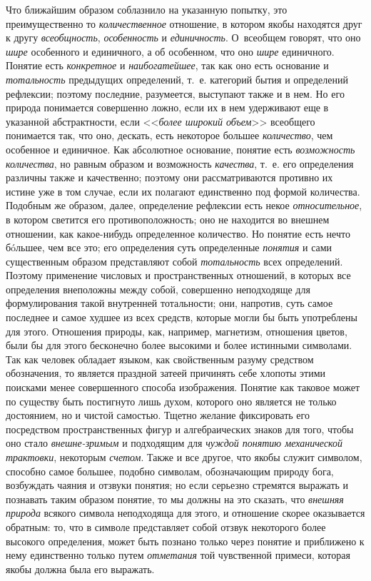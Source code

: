 Что ближайшим образом соблазнило на указанную попытку, это
преимущественно то {\em количественное}
отношение, в котором якобы находятся друг к другу
{\em всеобщность}, {\em особенность} и {\em единичность}.
О~всеобщем говорят, что оно {\em шире}
особенного и единичного, а об особенном, что оно
{\em шире} единичного. Понятие есть {\em конкретное}
и {\em наибогатейшее}, так как оно есть основание и {\em тотальность}
предыдущих определений, т.~е. категорий бытия и определений
рефлексии; поэтому последние, разумеется, выступают также и в нем. Но его
природа понимается совершенно ложно, если их в нем удерживают еще в
указанной абстрактности, если <<{\em более широкий объем}>>
всеобщего понимается так, что оно, дескать, есть некоторое
большее {\em количество},
чем особенное и единичное. Как абсолютное основание, понятие
есть {\em возможность количества},
но равным образом и возможность {\em качества}, т.~е. его
определения различны также и качественно; поэтому они рассматриваются
противно их истине уже в том случае, если их полагают единственно под
формой количества. Подобным же образом, далее, определение рефлексии есть
некое {\em относительное},
в котором светится его противоположность; оно не находится во
внешнем отношении, как какое-нибудь определенное количество. Но понятие
есть нечто бóльшее, чем все это; его определения суть определенные
{\em понятия} и сами существенным образом представляют собой
{\em тотальность} всех
определений. Поэтому применение числовых и пространственных отношений, в
которых все определения внеположны между собой, совершенно неподходяще для
формулирования такой внутренней тотальности; они, напротив, суть самое
последнее и самое худшее из всех средств, которые могли бы быть употреблены
для этого. Отношения природы, как, например, магнетизм, отношения цветов,
были бы для этого бесконечно более высокими и более истинными символами.
Так как человек обладает языком, как свойственным разуму средством
обозначения, то является праздной затеей причинять себе
хлопоты этими поисками менее совершенного способа изображения. Понятие как
таковое может по существу быть постигнуто лишь духом, которого оно является
не только достоянием, но и чистой самостью. Тщетно желание фиксировать его
посредством пространственных фигур и алгебраических знаков для того, чтобы
оно стало {\em внешне-зримым
}и подходящим для
{\em чуждой понятию механической
трактовки}, некоторым
{\em счетом}. Также и все
другое, что якобы служит символом, способно самое большее, подобно
символам, обозначающим природу бога, возбуждать чаяния и отзвуки понятия;
но если серьезно стремятся выражать и познавать таким образом понятие, то
мы должны на это сказать, что
{\em внешняя природа}
всякого символа неподходяща для этого, и отношение скорее
оказывается обратным: то, что в символе представляет собой отзвук
некоторого более высокого определения, может быть познано только через
понятие и приближено к нему единственно только путем
{\em отметания} той
чувственной примеси, которая якобы должна была его выражать.

